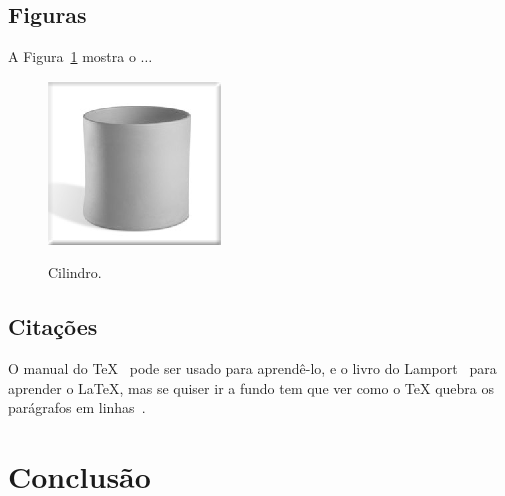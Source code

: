 \documentclass[
12pt,        %
openright,   %
twoside,     %
a4paper,     %
english,       %
brazil,        %
%
%
]{ppgca}
\begin{document}
\section{Figuras}

A Figura~\ref{fig:cilindro} mostra o $\ldots$

\begin{figure}[ht]
  \caption{Cilindro.}
  \centering
  \includegraphics{cilindro} 
  \label{fig:cilindro}
\end{figure}

\section{Citações}

O manual do \TeX~ pode ser usado para
aprendê-lo, e o livro do Lamport~\cite{lamport1994} para aprender o
\LaTeX{}, mas se quiser ir a fundo tem que ver como o \TeX
quebra os parágrafos em linhas~.


\chapter{Conclusão}

\lipsum[31-33]




%
%
\end{document}
